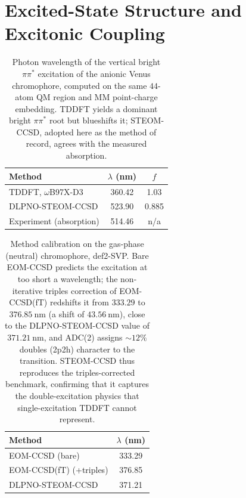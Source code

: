 \documentclass[journal=jpcbfk, manuscript=article, layout=twocolumn, doi=true]{achemso}
\begin{document}
\section{Excited-State Structure and Excitonic Coupling}

\begin{table}[t]
\centering
\caption{Photon wavelength of the vertical bright $\pi\pi^{*}$ excitation of the anionic Venus chromophore, computed on the same $44$-atom QM region and MM point-charge embedding. TDDFT yields a dominant bright $\pi\pi^{*}$ root but blueshifts it; STEOM-CCSD, adopted here as the method of record, agrees with the measured absorption.}
\label{tab:roots}
{\small\setlength{\tabcolsep}{3pt}
\begin{tabular}{lcc}
\toprule
Method & $\lambda$ (nm) & $f$ \\
\midrule
TDDFT, $\omega$B97X-D3      & 360.42 & 1.03 \\
DLPNO-STEOM-CCSD            & 523.90 & 0.885 \\
Experiment (absorption)     & 514.46 & n/a \\
\bottomrule
\end{tabular}}
\end{table}

\begin{table}[t]
\centering
\caption{Method calibration on the gas-phase (neutral) chromophore, def2-SVP. Bare EOM-CCSD predicts the excitation at too short a wavelength; the non-iterative triples correction of EOM-CCSD(fT) redshifts it from $333.29$ to $376.85~\mathrm{nm}$ (a shift of $43.56~\mathrm{nm}$), close to the DLPNO-STEOM-CCSD value of $371.21~\mathrm{nm}$, and ADC(2) assigns ${\sim}12\%$ doubles (2p2h) character to the transition. STEOM-CCSD thus reproduces the triples-corrected benchmark, confirming that it captures the double-excitation physics that single-excitation TDDFT cannot represent.}
\label{tab:ladder}
\begin{tabular}{lc}
\toprule
Method & $\lambda$ (nm) \\
\midrule
EOM-CCSD (bare)           & 333.29 \\
EOM-CCSD(fT) (+triples)   & 376.85 \\
DLPNO-STEOM-CCSD          & 371.21 \\
\bottomrule
\end{tabular}
\end{table}
\end{document}

